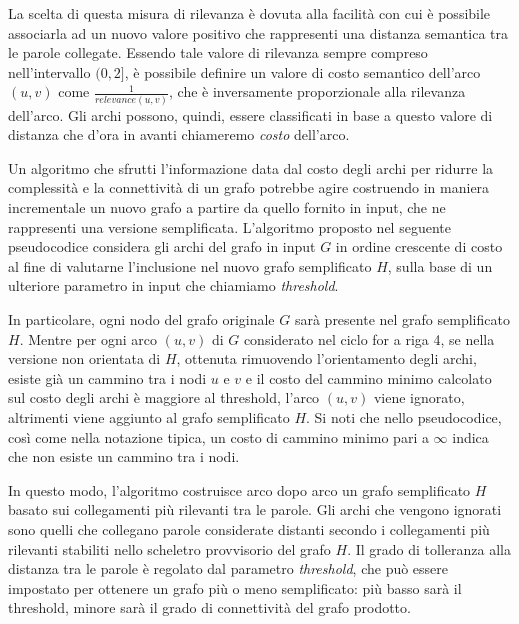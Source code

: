 La scelta di questa misura di rilevanza è dovuta alla facilità con cui è possibile associarla ad un nuovo valore
positivo che rappresenti una distanza semantica tra le parole collegate.
Essendo tale valore di rilevanza sempre compreso nell'intervallo $(0, 2]$, è possibile definire un valore di costo
semantico dell'arco $(u, v)$ come $\frac{1}{relevance(u, v)}$, che è inversamente proporzionale alla
rilevanza dell'arco.
Gli archi possono, quindi, essere classificati in base a questo valore di distanza che d'ora in avanti chiameremo
\textit{costo} dell'arco.


Un algoritmo che sfrutti l'informazione data dal costo degli archi per ridurre la complessità e la connettività
di un grafo potrebbe agire costruendo in maniera incrementale un nuovo grafo a partire da quello fornito in input,
che ne rappresenti una versione semplificata.
L'algoritmo proposto nel seguente pseudocodice considera gli archi del grafo in input $G$ in ordine crescente di
costo al fine di valutarne l'inclusione nel nuovo grafo semplificato $H$, sulla base di un ulteriore parametro in input
che chiamiamo \textit{threshold}.

In particolare, ogni nodo del grafo originale $G$ sarà presente nel grafo semplificato $H$. Mentre per ogni arco $(u, v)$
di $G$ considerato nel ciclo for a riga 4, se nella versione non orientata di $H$, ottenuta rimuovendo l'orientamento
degli archi, esiste già un cammino tra i nodi $u$ e $v$ e il costo del cammino minimo calcolato sul costo degli archi
è maggiore al threshold, l'arco $(u, v)$ viene ignorato, altrimenti viene aggiunto al grafo semplificato $H$.
Si noti che nello pseudocodice, così come nella notazione tipica, un costo di cammino minimo pari a $\infty$ indica
che non esiste un cammino tra i nodi.



In questo modo, l'algoritmo costruisce arco dopo arco un grafo semplificato $H$ basato sui collegamenti più
rilevanti tra le parole.
Gli archi che vengono ignorati sono quelli che collegano parole considerate distanti secondo i collegamenti più
rilevanti stabiliti nello scheletro provvisorio del grafo $H$.
Il grado di tolleranza alla distanza tra le parole è regolato dal parametro \textit{threshold},
che può essere impostato per ottenere un grafo più o meno semplificato: più basso sarà il threshold, minore
sarà il grado di connettività del grafo prodotto.

